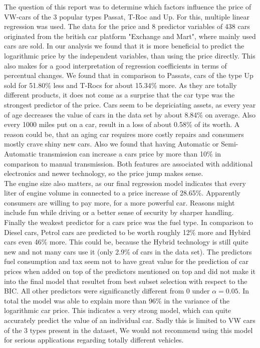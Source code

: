 \documentclass[12 pt]{scrartcl}
\begin{document}
The question of this report was to determine which factors influence the price of VW-cars of the 3 popular types Passat, T-Roc and Up. For this, multiple linear regression was used. The data for the price and 8 predictor variables of 438 cars originated from the british car platform "Exchange and Mart", where mainly used cars are sold. In our analysis we found that it is more beneficial to predict the logarithmic price by the independent variables, than using the price directly. This also makes for a good interpretation of regression coefficients in terms of percentual changes. We found that in comparison to Passats, cars of the type Up sold for 51.80\% less and T-Rocs for about 15.34\% more. As they are totally different products, it does not come as a surprise that the car type was the strongest predictor of the price.
Cars seem to be depriciating assets, as every year of age decreases the value of cars in the data set by about 8.84\% on average. Also every 1000 miles put on a car, result in a loss of about 0.58\% of its worth. A reason could be, that an aging car requires more costly repairs and consumers mostly crave shiny new cars.
Also we found that having Automatic or Semi-Automatic transmission can increase a cars price by more than 10\% in comparison to manual transmission. Both features are associated with additional electronics and newer technology, so the price jump makes sense. \\
The engine size also matters, as our final regression model indicates that every liter of engine volume in connected to a price increase of 28.65\%. Apparently consumers are willing to pay more, for a more powerful car. Reasons might include fun while driving or a better sense of security by sharper handling.
Finally the weakest predictor for a cars price was the fuel type. In comparison to Diesel cars, Petrol cars are predicted to be worth roughly 12\% more and Hybird cars even 46\% more. This could be, because the Hybrid technology is still quite new and not many cars use it (only 2.9\% of cars in the data set).
The predictors fuel consumption and tax seem not to have great value for the prediction of car prices when added on top of the predictors mentioned on top and did not make it into the final model that resultet from best subset selection with respect to the BIC. All other predictors were significanctly different from 0 under $\alpha = 0.05$.
In total the model was able to explain more than 96\% in the variance of the logarithmic car price. This indicates a very strong model, which can quite accurately predict the value of an individual car. Sadly this is limited to VW cars of the 3 types present in the dataset, We would not recommend using this model for serious applications regarding totally different vehicles. \\
\end{document}
